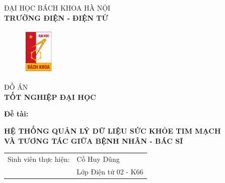 
\begin{titlepage}
     \begin{center}
     \vspace{-12pt} ĐẠI HỌC BÁCH KHOA HÀ NỘI \\ %
     \textbf{\fontsize{16pt}{0pt}\selectfont TRƯỜNG ĐIỆN - ĐIỆN TỬ}
     \begin{figure}[H] %
         \vspace{0.5cm} %
         \centering
         \includegraphics[width=1.53cm,height=2.26cm]{Images/logohust.png}
     \end{figure}
     \vspace{1.5cm}
     \fontsize{24pt}{0pt}\selectfont ĐỒ ÁN \\ %
     \vspace{12pt}
     \textbf{\fontsize{32pt}{0pt}\selectfont TỐT NGHIỆP ĐẠI HỌC} %
     \vspace{1.5cm}
     \end{center}
     \hspace{8pt}\textbf{\fontsize{14pt}{0pt}\selectfont Đề tài:}
     \begin{center}
   
          \textbf{\fontsize{18pt}{0pt}\selectfont HỆ THỐNG QUẢN LÝ DỮ LIỆU SỨC KHỎE TIM MẠCH}\\
           \textbf{\fontsize{18pt}{0pt}\selectfont VÀ TƯƠNG TÁC GIỮA BỆNH NHÂN - BÁC SĨ}
     
     \vspace{1.5cm}
     
     \begin{table}[H]%
          \centering
          \begin{tabular}{l l}
               \fontsize{14pt}{0pt}\selectfont Sinh viên thực hiện:      & \fontsize{14pt}{0pt}\selectfont Cồ Huy Dũng\\
                 &\fontsize{14pt}{0pt}\selectfont Lớp Điện tử 02 - K66  \vspace{6pt} \\
                 

\end{tabular}
\end{table}
\end{center}
\end{titlepage}
